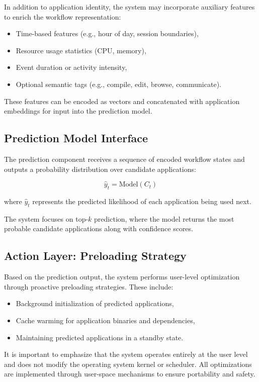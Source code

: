 \documentclass[11pt]{article}
\begin{document}
In addition to application identity, the system may incorporate auxiliary features to enrich the workflow representation:

\begin{itemize}
\item Time-based features (e.g., hour of day, session boundaries),
\item Resource usage statistics (CPU, memory),
\item Event duration or activity intensity,
\item Optional semantic tags (e.g., compile, edit, browse, communicate).
\end{itemize}

These features can be encoded as vectors and concatenated with application embeddings for input into the prediction model.

\subsection{Prediction Model Interface}

The prediction component receives a sequence of encoded workflow states and outputs a probability distribution over candidate applications:

\[
\hat{y}_t = \text{Model}(C_t)
\]

where $\hat{y}_t$ represents the predicted likelihood of each application being used next.

The system focuses on top-$k$ prediction, where the model returns the most probable candidate applications along with confidence scores.

\subsection{Action Layer: Preloading Strategy}

Based on the prediction output, the system performs user-level optimization through proactive preloading strategies. These include:

\begin{itemize}
\item Background initialization of predicted applications,
\item Cache warming for application binaries and dependencies,
\item Maintaining predicted applications in a standby state.
\end{itemize}

It is important to emphasize that the system operates entirely at the user level and does not modify the operating system kernel or scheduler. All optimizations are implemented through user-space mechanisms to ensure portability and safety.
\end{document}

